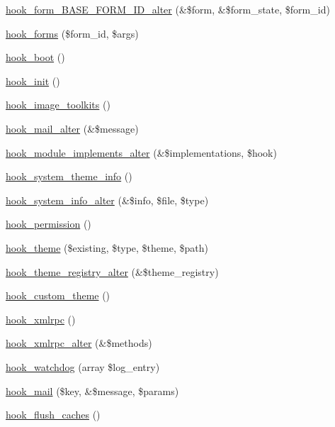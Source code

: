 \begin{DoxyCompactItemize}
\item 
\hyperlink{group__hooks_gaf0cfc224a88c8823da68856c30a4841a}{hook\_\-form\_\-BASE\_\-FORM\_\-ID\_\-alter} (\&\$form, \&\$form\_\-state, \$form\_\-id)
\item 
\hyperlink{group__hooks_gaa764fee74b85797f75c0c923cad628d5}{hook\_\-forms} (\$form\_\-id, \$args)
\item 
\hyperlink{group__hooks_ga9ac1dfffdc69471a3d00d67503c71577}{hook\_\-boot} ()
\item 
\hyperlink{group__hooks_ga74edef0c463436fdbb1f92ef367db051}{hook\_\-init} ()
\item 
\hyperlink{group__hooks_ga9abe202036afcc6a3cc97ccc2c13ab29}{hook\_\-image\_\-toolkits} ()
\item 
\hyperlink{group__hooks_gaad1d55a8e7b359933f462a9ca5b2ede0}{hook\_\-mail\_\-alter} (\&\$message)
\item 
\hyperlink{group__hooks_gab71c322e6487a3b99bd04c5b9adb13f6}{hook\_\-module\_\-implements\_\-alter} (\&\$implementations, \$hook)
\item 
\hyperlink{group__hooks_gaf21de71044d5a79bde481d2383e12c9a}{hook\_\-system\_\-theme\_\-info} ()
\item 
\hyperlink{group__hooks_ga7dd7f887131916d5bbbb02ae87a9113e}{hook\_\-system\_\-info\_\-alter} (\&\$info, \$file, \$type)
\item 
\hyperlink{group__hooks_ga2b22b45f4925f2478412477bae329713}{hook\_\-permission} ()
\item 
\hyperlink{group__hooks_ga013ccb45c7aaab1c16cf9691428c910d}{hook\_\-theme} (\$existing, \$type, \$theme, \$path)
\item 
\hyperlink{group__hooks_gadd6cabb9ce825efccefb4918321932a5}{hook\_\-theme\_\-registry\_\-alter} (\&\$theme\_\-registry)
\item 
\hyperlink{group__hooks_gab83dce4ef80bc5005ee0de98fc005b1f}{hook\_\-custom\_\-theme} ()
\item 
\hyperlink{group__hooks_ga9debe627e55ecff58ffaf71689dbec2e}{hook\_\-xmlrpc} ()
\item 
\hyperlink{group__hooks_ga78ca7e3728a28b5d22152168b2b264cf}{hook\_\-xmlrpc\_\-alter} (\&\$methods)
\item 
\hyperlink{group__hooks_gab2b8bf0289fad4b39485e933012f290c}{hook\_\-watchdog} (array \$log\_\-entry)
\item 
\hyperlink{group__hooks_gacdeb1cba0d0a86ac4de3fff7d4765777}{hook\_\-mail} (\$key, \&\$message, \$params)
\item 
\hyperlink{group__hooks_ga66531e6e564157b7ca45ed07549c9b97}{hook\_\-flush\_\-caches} ()

\end{DoxyCompactItemize}
